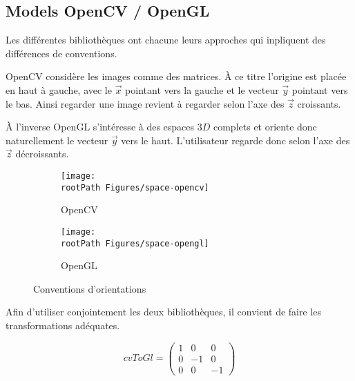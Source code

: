 \documentclass[10pt,a4paper,twoside, twocolumn]{report}
\newcommand*{\rootPath}{../}
\begin{document}
\subsection{Models OpenCV / OpenGL}

Les différentes bibliothèques ont chacune leurs approches qui inpliquent des différences de conventions.

OpenCV considère les images comme des matrices. À ce titre l’origine est placée en haut à gauche, avec le $\vec x$ pointant vers la gauche et le vecteur $\vec y$ pointant vers le bas. Ainsi regarder une image revient à regarder selon l’axe des $\vec z$ croissants.

% 	

À l’inverse OpenGL s’intéresse à des espaces $3D$ complets et oriente donc naturellement le vecteur $\vec y$ vers le haut. L’utilisateur regarde donc selon l’axe des $\vec z$ décroissants.

% 	

\begin{figure}[!ht]\centering
	\begin{subfigure}[b]{0.22\textwidth}\centering
		\texttt{[image: \\rootPath Figures/space-opencv]}
		\caption{OpenCV}
	\end{subfigure}
	\begin{subfigure}[b]{0.2\textwidth}\centering
		\texttt{[image: \\rootPath Figures/space-opengl]}
		\caption{OpenGL}
	\end{subfigure}

	\caption{Conventions d’orientations}
	\label{fig:tikz:conventions}
\end{figure}


Afin d’utiliser conjointement les deux bibliothèques, il convient de faire les transformations adéquates.

\begin{equation}
	cvToGl = \begin{pmatrix}1 & 0 & 0 \\ 0 & -1 & 0 \\ 0 & 0 & -1\end{pmatrix}
\end{equation}

\ifstandalone
	
	
\fi
\end{document}
